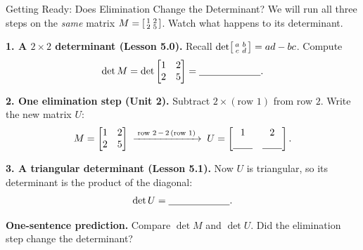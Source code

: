 \documentclass[10pt]{article}
\begin{document}
\namedateperiod

\vspace{0.12in}

\begin{notesbox}{Getting Ready: Does Elimination Change the Determinant?}
\small We will run all three steps on the \emph{same} matrix
$M=\begin{bsmallmatrix} 1 & 2 \\ 2 & 5 \end{bsmallmatrix}$. Watch what happens to its determinant.

\vspace{4pt}
\textbf{1. A $2\times2$ determinant (Lesson 5.0).} Recall
$\det\begin{bsmallmatrix} a & b\\ c & d \end{bsmallmatrix}=ad-bc$. Compute
\[
  \det M = \det\begin{bmatrix} 1 & 2 \\ 2 & 5 \end{bmatrix} = \blank{2.2cm}.
\]

\vspace{4pt}
\textbf{2. One elimination step (Unit 2).} Subtract $2\times(\text{row }1)$ from row $2$. Write the new
matrix $U$:
\[
  M=\begin{bmatrix} 1 & 2 \\ 2 & 5 \end{bmatrix}
  \;\xrightarrow{\;\text{row }2\,-\,2\,(\text{row }1)\;}\;
  U=\begin{bmatrix} 1 & 2 \\ \blank{0.7cm} & \blank{0.7cm} \end{bmatrix}.
\]

\vspace{4pt}
\textbf{3. A triangular determinant (Lesson 5.1).} Now $U$ is triangular, so its determinant is the
product of the diagonal:
\[
  \det U = \blank{2.2cm}.
\]

\vspace{4pt}
\textbf{One-sentence prediction.} Compare $\det M$ and $\det U$. Did the elimination step change the
determinant? \writeline
\end{notesbox}
\end{document}
